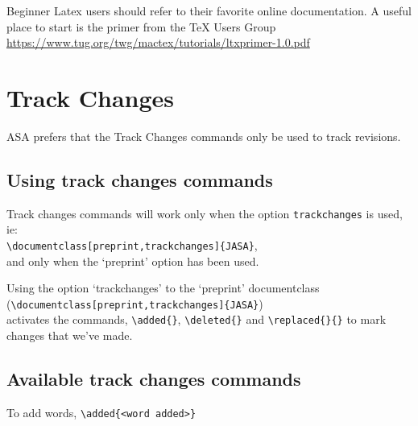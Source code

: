 \documentclass[preprint,trackchanges]{JASA}
\begin{document}
  Beginner Latex users should refer to their favorite online documentation. A 
  useful place to start is the primer from the TeX Users Group 
  \url{https://www.tug.org/twg/mactex/tutorials/ltxprimer-1.0.pdf}







\section{Track Changes}
ASA prefers that the Track Changes commands only be used to
track revisions.

\subsection{Using track changes commands}
Track changes commands will work only when the option
\verb+trackchanges+ is used, ie:\\
\verb+\documentclass[preprint,trackchanges]{JASA}+,\\
and only when the `preprint' option has been used.

Using the option `trackchanges' to the `preprint' documentclass\\
(\verb+\documentclass[preprint,trackchanges]{JASA}+)\\
activates the commands, \verb+\added{}+, \verb+\deleted{}+
and \verb+\replaced{}{}+ to mark changes that we've made.

\subsection{Available track changes commands}

To add words, \verb+\added{<word added>}+
\end{document}
